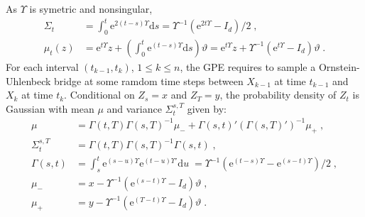 \documentclass[12pt]{article}
\newcommand{\rmd}{\mathrm{d}}
\newcommand{\eqsp}{\;}
\newcommand{\1}{\mathrm{1}}
\begin{document}
As $\Upsilon$ is symetric and nonsingular,
\begin{align*}
\Sigma_{t} &= \int_0^{t} \mathrm{e}^{2(t -s)\Upsilon}\rmd s = \Upsilon^{-1}(\mathrm{e}^{2t\Upsilon}-I_d)/2\eqsp,\\
\mu_{t}(z) &= \mathrm{e}^{t \Upsilon}z + \left(\int_0^t\mathrm{e}^{(t-s)\Upsilon} \rmd s\right)\vartheta = \mathrm{e}^{t \Upsilon}z + \Upsilon^{-1}(\mathrm{e}^{t\Upsilon}-I_d)\vartheta \eqsp.
\end{align*}
For each interval $(t_{k-1},t_k)$, $1\le k \le n$, the GPE requires to sample a Ornstein-Uhlenbeck bridge at some ramdom time steps between $X_{k-1}$ at time $t_{k-1}$ and $X_k$ at time $t_k$. Conditional on $Z_s = x$ and $Z_T = y$, the probability density of $Z_t$ is Gaussian with mean $\mu$ and variance $\Sigma_t^{s,T}$ given by: 
\begin{align*}
\mu &=\Gamma(t,T)\Gamma(s,T)^{-1}\mu_- + \Gamma(s,t)'(\Gamma(s,T)')^{-1}\mu_+\eqsp,\\
\Sigma_t^{s,T} &=\Gamma(t,T)\Gamma(s,T)^{-1}\Gamma(s,t)\eqsp,\\
\Gamma(s,t)&=\int_s^{t} \mathrm{e}^{(s -u)\Upsilon}\mathrm{e}^{(t -u)\Upsilon'}\rmd u\eqsp = \Upsilon^{-1}\left(\mathrm{e}^{(t -s)\Upsilon}-\mathrm{e}^{(s -t)\Upsilon}\right)/2\eqsp,\\
\mu_- &= x - \Upsilon^{-1}(\mathrm{e}^{(s -t)\Upsilon}-I_d)\vartheta\eqsp,\\
\mu_+ &= y-\Upsilon^{-1}(\mathrm{e}^{(T -t)\Upsilon}-I_d)\vartheta\eqsp.
\end{align*}




\end{document}
